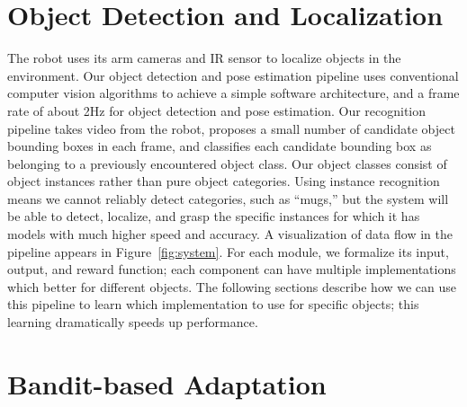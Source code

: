 \documentclass{article}
\begin{document}

\section{Object Detection and Localization}

The robot uses its arm cameras and IR sensor to localize objects in
the environment.  Our object detection and pose estimation pipeline
uses conventional computer vision algorithms to achieve a simple
software architecture, and a frame rate of about 2Hz for object
detection and pose estimation.  Our recognition pipeline takes video
from the robot, proposes a small number of candidate object bounding
boxes in each frame, and classifies each candidate bounding box as
belonging to a previously encountered object class. Our object classes
consist of object instances rather than pure object categories.  Using
instance recognition means we cannot reliably detect categories, such
as ``mugs,'' but the system will be able to detect, localize, and
grasp the specific instances for which it has models with much higher
speed and accuracy.  A visualization of data flow in the pipeline
appears in Figure~\ref{fig:system}.  For each module, we formalize its
input, output, and reward function; each component can have multiple
implementations which better for different objects.  The following
sections describe how we can use this pipeline to learn which
implementation to use for specific objects; this learning dramatically
speeds up performance.


\section{Bandit-based Adaptation}
\end{document}
